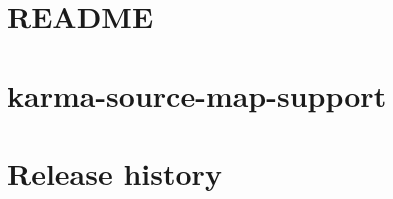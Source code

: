 \documentclass[twoside]{book}
\newcommand{\+}{\discretionary{\mbox{\scriptsize$\hookleftarrow$}}{}{}}
\begin{document}
\chapter{README}
\label{md__c___users_vaishnavi_jadhav__desktop__developer_code_mean_stack_example_client_node_modules_jsonparse__r_e_a_d_m_e}

\chapter{karma-\/source-\/map-\/support}
\label{md__c___users_vaishnavi_jadhav__desktop__developer_code_mean_stack_example_client_node_modules_karma_source_map_support_readme}

\chapter{Release history}
\label{md__c___users_vaishnavi_jadhav__desktop__developer_code_mean_stack_example_client_node_modules_kind_of__c_h_a_n_g_e_l_o_g}

\end{document}
